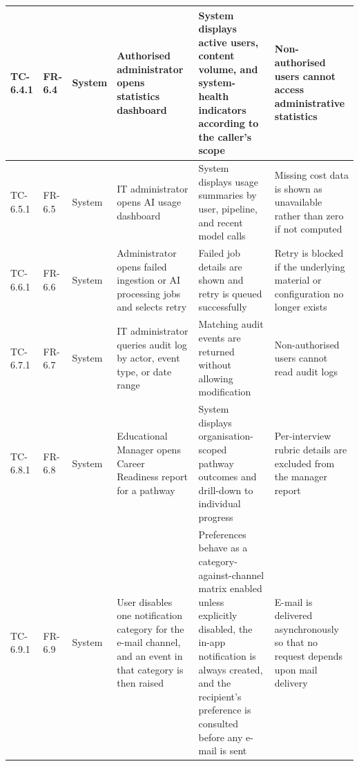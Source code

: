 \begin{longtable}{|>{\centering\arraybackslash}m{}|>{\centering\arraybackslash}m{}|>{\centering\arraybackslash}m{}|m{}|m{}|m{}|}
TC-6.4.1 & FR-6.4 & System & Authorised administrator opens statistics dashboard & System displays active users, content volume, and system-health indicators according to the caller's scope & Non-authorised users cannot access administrative statistics \\ \hline

TC-6.5.1 & FR-6.5 & System & IT administrator opens AI usage dashboard & System displays usage summaries by user, pipeline, and recent model calls & Missing cost data is shown as unavailable rather than zero if not computed \\ \hline

TC-6.6.1 & FR-6.6 & System & Administrator opens failed ingestion or AI processing jobs and selects retry & Failed job details are shown and retry is queued successfully & Retry is blocked if the underlying material or configuration no longer exists \\ \hline

TC-6.7.1 & FR-6.7 & System & IT administrator queries audit log by actor, event type, or date range & Matching audit events are returned without allowing modification & Non-authorised users cannot read audit logs \\ \hline

TC-6.8.1 & FR-6.8 & System & Educational Manager opens Career Readiness report for a pathway & System displays organisation-scoped pathway outcomes and drill-down to individual progress & Per-interview rubric details are excluded from the manager report \\ \hline

TC-6.9.1 & FR-6.9 & System & User disables one notification category for the e-mail channel, and an event in that category is then raised & Preferences behave as a category-against-channel matrix enabled unless explicitly disabled, the in-app notification is always created, and the recipient's preference is consulted before any e-mail is sent & E-mail is delivered asynchronously so that no request depends upon mail delivery \\ \hline

\end{longtable}


